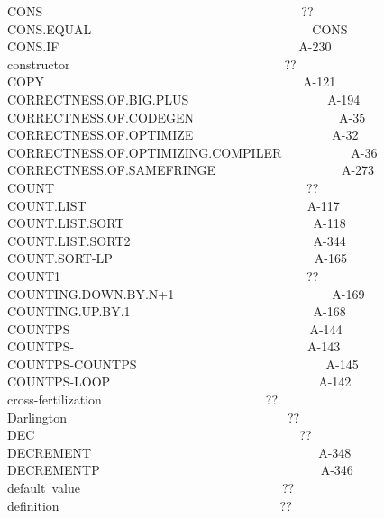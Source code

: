 \documentclass[11pt]{book}
\newenvironment{pubasis}{\begin{flushleft}\ttfamily\small}{\normalsize\rmfamily\end{flushleft}}
\begin{document}
\begin{pubasis}
CONS~~~~~~~~~~~~~~~~~~~~~~~~~~~~~~~~~~~~~~~~~??\\
CONS.EQUAL~~~~~~~~~~~~~~~~~~~~~~~~~~~~~~~~~~~CONS\\
CONS.IF~~~~~~~~~~~~~~~~~~~~~~~~~~~~~~~~~~~~~~A-230\\
constructor~~~~~~~~~~~~~~~~~~~~~~~~~~~~~~~~~~??\\
COPY~~~~~~~~~~~~~~~~~~~~~~~~~~~~~~~~~~~~~~~~~A-121\\
CORRECT\-NESS.OF.BIG.PLUS~~~~~~~~~~~~~~~~~~~~~~A-194\\
CORRECT\-NESS.OF.CODEGEN~~~~~~~~~~~~~~~~~~~~~~~A-35\\
CORRECT\-NESS.OF.OPTIMIZE~~~~~~~~~~~~~~~~~~~~~~A-32\\
CORRECT\-NESS.OF.OPTIMIZING.COMPILER~~~~~~~~~~~A-36\\
CORRECT\-NESS.OF.SAMEFRINGE~~~~~~~~~~~~~~~~~~~~A-273\\
COUNT~~~~~~~~~~~~~~~~~~~~~~~~~~~~~~~~~~~~~~~~??\\
COUNT.LIST~~~~~~~~~~~~~~~~~~~~~~~~~~~~~~~~~~~A-117\\
COUNT.LIST.SORT~~~~~~~~~~~~~~~~~~~~~~~~~~~~~~A-118\\
COUNT.LIST.SORT2~~~~~~~~~~~~~~~~~~~~~~~~~~~~~A-344\\
COUNT.SORT-LP~~~~~~~~~~~~~~~~~~~~~~~~~~~~~~~~A-165\\
COUNT1~~~~~~~~~~~~~~~~~~~~~~~~~~~~~~~~~~~~~~~??\\
COUNTING.DOWN.BY.N+1~~~~~~~~~~~~~~~~~~~~~~~~~A-169\\
COUNTING.UP.BY.1~~~~~~~~~~~~~~~~~~~~~~~~~~~~~A-168\\
COUNTPS~~~~~~~~~~~~~~~~~~~~~~~~~~~~~~~~~~~~~~A-144\\
COUNTPS-~~~~~~~~~~~~~~~~~~~~~~~~~~~~~~~~~~~~~A-143\\
COUNTPS-COUNTPS~~~~~~~~~~~~~~~~~~~~~~~~~~~~~~A-145\\
COUNTPS-LOOP~~~~~~~~~~~~~~~~~~~~~~~~~~~~~~~~~A-142\\
cross-fertilization~~~~~~~~~~~~~~~~~~~~~~~~~~??\\
Darlington~~~~~~~~~~~~~~~~~~~~~~~~~~~~~~~~~~~??\\
DEC~~~~~~~~~~~~~~~~~~~~~~~~~~~~~~~~~~~~~~~~~~??\\
DECREMENT~~~~~~~~~~~~~~~~~~~~~~~~~~~~~~~~~~~~A-348\\
DECREMENTP~~~~~~~~~~~~~~~~~~~~~~~~~~~~~~~~~~~A-346\\
default~value~~~~~~~~~~~~~~~~~~~~~~~~~~~~~~~~??\\
definition~~~~~~~~~~~~~~~~~~~~~~~~~~~~~~~~~~~??\\

\end{pubasis}
\end{document}
